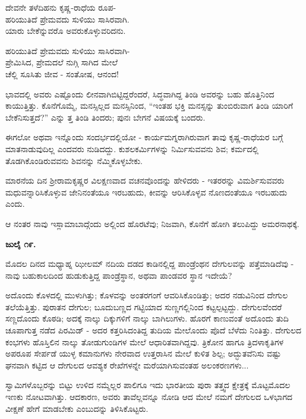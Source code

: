 \begin{myquote}
ದೇವನೇ ತಳೆದಿಹನು ಕೃಷ್ಣ-ರಾಧೆಯ ರೂಪ-\\ಹರಿಯುತಿದೆ ಪ್ರೇಮವದು ಸುಳಿಯು ಸಾಸಿರವಾಗಿ.\\ಯಾರು ಬೇಕೆನ್ನುವರೊ ಅವರುಕೊಳ್ಳುವರಿದನು.
\end{myquote}

\begin{myquote}
ಹರಿಯುತಿದೆ ಪ್ರೇಮವದು ಸುಳಿಯು ಸಾಸಿರವಾಗಿ-\\ಪ್ರೇಮಿಸಿದ, ಪ್ರೇಮದಲೆ ನುಗ್ಗಿ ಸಾಗಿದ ಮೇಲೆ\\ಚೆಲ್ಲಿ ಸೂಸಿತು ಜೀವ - ಸಂತೋಷ, ಆನಂದ!
\end{myquote}

ಭಾವದಲ್ಲಿ ಅವರು ಎಷ್ಟೊಂದು ಲೀನವಾಗಿಬಿಟ್ಟಿದ್ದರೆಂದರೆ, ಸಿದ್ಧವಾಗಿದ್ದ ತಿಂಡಿ ಅವರನ್ನು ಬಹು ಹೊತ್ತಿನಿಂದ ಕಾಯುತ್ತಿತ್ತು. ಕೊನೆಗೊಮ್ಮೆ, ಮನಸ್ಸಿಲ್ಲದ ಮನಸ್ಸಿನಿಂದ, “ಇಂತಹ ಭಕ್ತಿ ಮನಸ್ಸನ್ನು ತುಂಬಿರುವಾಗ ತಿಂಡಿ ಯಾರಿಗೆ ಬೇಕೆನಿಸುತ್ತದೆ?” ಎನ್ನು ತ್ತ ತಿಂಡಿ ತಿಂದರು; ಪುನಃ ಬೇಗನೆ ವಿಷಯಕ್ಕೆ ಬಂದರು.

ಈಗಲೋ ಅಥವಾ ಇನ್ನೊಂದು ಸಂದರ್ಭದಲ್ಲಿಯೋ - ಕಾರ್ಯಮಗ್ನರಾಗಿರುವಾಗ ತಾವು ಕೃಷ್ಣ-ರಾಧೆಯರ ಬಗ್ಗೆ ಮಾತನಾಡುವುದಿಲ್ಲ ಎಂದವರು ನುಡಿದದ್ದು. ಕುಶಲಕರ್ಮಿಗಳನ್ನು ನಿರ್ಮಿಸುವವನು ಶಿವ; ಕರ್ಮದಲ್ಲಿ ತೊಡಗಿಕೊಂಡಿರುವವನು ಶಿವನನ್ನು ನೆಮ್ಮಿಕೊಳ್ಳಬೇಕು.

ಮಾರನೆಯ ದಿನ ಶ‍್ರೀರಾಮಕೃಷ್ಣರ ವಿಲಕ್ಷಣವಾದ ವಚನವೊಂದನ್ನು ಹೇಳಿದರು - ಇತರರನ್ನು ವಿಮರ್ಶಿಸುವವರು ಮಧುವನ್ನಾರಿಸಿಕೊಳ್ಳುವ ಜೇನಿನಂತೆಯೂ ಇರಬಹುದು, ಕೀವನ್ನು ಆರಿಸಿಕೊಳ್ಳವ ನೊಣದಂತೆಯೂ ಇರಬಹುದು ಎಂದು.

ಆ ನಂತರ ನಾವು ಇಸ್ಲಾಮಾಬಾದ್ಗೆಂದು ಅಲ್ಲಿಂದ ಹೊರಟೆವು; ನಿಜವಾಗಿ, ಕೊನೆಗೆ ಹೋಗಿ ತಲುಪಿದ್ದು ಅಮರನಾಥಕ್ಕೆ.

\textbf{ಜುಲೈ ೧೯.}

ಮೊದಲ ದಿನದ ಮಧ್ಯಾಹ್ನ ಝೀಲಮ್​ ನದಿಯ ದಡದ ಕಾಡಿನಲ್ಲಿದ್ದ ಪಾಂಡ್ರೆಂಥನ ದೇಗುಲವನ್ನು ಪತ್ತೆಮಾಡಿದೆವು - ನಾವು ಬಹುಕಾಲದಿಂದ ಹುಡುಕುತ್ತಿದ್ದ ಪಾಂಡ್ರೆಸ್ಥಾನ, ಅಥವಾ ಪಾಂಡವರ ಸ್ಥಾನ ಇದೇಯೆ?

ಅದೊಂದು ಕೊಳದಲ್ಲಿ ಮುಳುಗಿತ್ತು; ಕೊಳವನ್ನು ಅಂತರಗಂಗೆ ಆವರಿಸಿಕೊಂಡಿತ್ತು; ಅದರ ನಡುವಿನಿಂದ ದೇಗುಲ ತಲೆಯೆತ್ತಿತ್ತು. ಪುರಾತನ ದೇಗುಲ; ಬೂದುಬಣ್ಣದ ಗಟ್ಟಿಯಾದ ಸುಣ್ಣಗಲ್ಲಿನಿಂದ ಕಟ್ಟಲ್ಪಟ್ಟದ್ದು. ದೇಗುಲವೆಂದರೆ ಸಣ್ಣದೊಂದು ಕೊಠಡಿ; ಅದಕ್ಕೆ ನಾಲ್ಕು ದಿಕ್ಕುಗಳಿಗೆ ನಾಲ್ಕು ಬಾಗಿಲುಗಳು. ಹೊರಗೆ ಕಾಣುವಂತೆ ಅದೊಂದು ತುದಿ ಚೂಪಾಗುತ್ತ ನಡೆದ ಪಿರಮಿಡ್ - ಅದರ ಕತ್ತರಿಸಿದಂತಿದ್ದ ತುದಿಯ ಮೇಲೊಂದು ಪೊದೆ ಬೆಳೆದು ನಿಂತಿತ್ತು. ದೇಗುಲದ ಕಂಭಗಳು ಹೊಸ್ತಿಲಿನ ನಾಲ್ಕು ತೋಡುಗುಂಡಿಗಳ ಮೇಲೆ ಆಧಾರಿತವಾಗಿದ್ದವು. ತ್ರಿಕೋನ ಹಾಗೂ ತ್ರಿದಳಾಕೃತಿಗಳ ಅಪರೂಪ ಸೇರ್ಪಡೆ ಯುಳ್ಳ ಕಮಾನುಗಳು ನೇರವಾದ ಉತ್ತರಾಸಿನ ಮೇಲೆ ಕುಳಿತ ಶಿಲ್ಪ; ಅದ್ಭುತವೆನಿಸು ವಷ್ಟು ಘನವಾಗಿ ಕಟ್ಟಿದ ಆ ದೇಗುಲದ ಆವಶ್ಯಕ ರೇಖೆಗಳನ್ನೇ ಮರೆಯಾಗಿಸುವಂತಹ ಅಲಂಕರಣಗಳು...

ಸ್ವಾಮಿಗಳೊಬ್ಬರನ್ನು ಬಿಟ್ಟು ಉಳಿದ ನಮ್ಮೆಲ್ಲರ ಪಾಲಿಗೂ ಇದು ಭಾರತೀಯ ಪುರಾ ತತ್ತ್ವದ ಕ್ಷೇತ್ರಕ್ಕೆ ಮೊಟ್ಟಮೊದಲ ಇಣಕು ನೋಟವಾಗಿತ್ತು. ಆದಕಾರಣ, ಅವರು ತಾವೆಲ್ಲವನ್ನೂ ನೋಡಿ ಆದ ಮೇಲೆ ನಮಗೆ ದೇಗುಲದ ಒಳಭಾಗದ ವೀಕ್ಷಣೆ ಹೇಗೆ ಮಾಡಬೇಕು ಎಂಬುದನ್ನು ತಿಳಿಸಿಕೊಟ್ಟರು.

